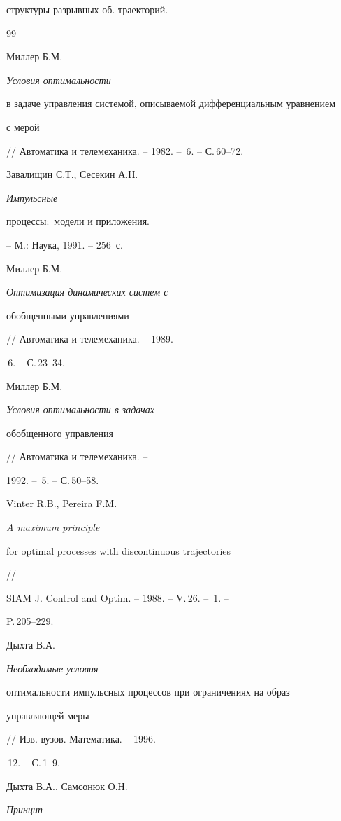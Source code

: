 структуры разрывных об. траекторий.








\begin{thebibliography}{99}







Миллер Б.М. {\em Условия оптимальности


в задаче управления системой, описываемой дифференциальным уравнением


с мерой} // Автоматика и телемеханика. -- 1982. -- \No\,6. -- С.\,60--72.




Завалищин С.Т., Сесекин А.Н. {\em Импульсные


процессы${:}$ модели и приложения.} -- М.: Наука, 1991. -- 256~с.




Миллер Б.М. {\em Оптимизация динамических систем с


обобщенными управлениями} // Автоматика и телемеханика. -- 1989. --


\No\,6. -- С.\,23--34.




Миллер Б.М. {\em Условия оптимальности в задачах


обобщенного управления} // Автоматика и телемеханика. --


1992. -- \No\,5. -- С.\,50--58.




Vinter R.B., Pereira F.M. {\em A maximum principle


for optimal processes with discontinuous trajectories} //


SIAM J. Control and Optim. -- 1988. -- V.\,26. -- \No\,1. --


P.\,205--229.




Дыхта В.А. {\em Необходимые условия


оптимальности импульсных процессов при ограничениях на образ


управляющей меры} // Изв. вузов. Математика. -- 1996. --


\No\,12. -- С.\,1--9.




Дыхта В.А., Самсонюк О.Н. {\em Принцип


}
\end{thebibliography}
